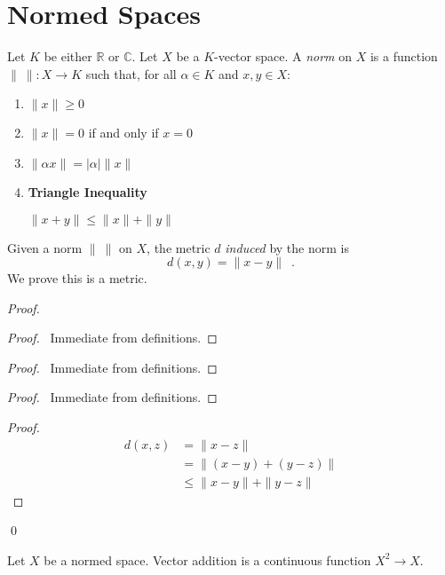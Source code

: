 \chapter{Normed Spaces}

\begin{df}[Norm]
  Let $K$ be either $\mathbb{R}$ or $\mathbb{C}$. Let $X$ be a $K$-vector space. A \emph{norm} on $X$ is a function $\|\ \| : X \rightarrow K$ such that, for all $\alpha \in K$ and $x, y \in X$:
  \begin{enumerate}
    \item
    $\| x \| \geq 0$
    \item
    $\| x \| = 0$ if and only if $x = 0$
    \item
    $\| \alpha x \| = | \alpha | \| x \|$
    \item
    \textbf{Triangle Inequality}

    $\| x + y \| \leq \| x \| + \| y \|$
  \end{enumerate}
\end{df}

\begin{df}
  Given a norm $\|\ \|$ on $X$, the metric $d$ \emph{induced} by the norm is
  \[ d(x,y) = \| x - y \| \enspace . \]
  We prove this is a metric.
\end{df}

\begin{proof}
  \pf
  \begin{proof}
    \pf\ Immediate from definitions.
  \end{proof}
  \begin{proof}
    \pf\ Immediate from definitions.
  \end{proof}
  \begin{proof}
    \pf\ Immediate from definitions.
  \end{proof}
  \begin{proof}
    \pf
    \begin{align*}
      d(x,z) & = \|x - z\| \\
      & = \|(x - y) + (y - z)\| \\
      & \leq \|x - y\| + \|y - z\|
    \end{align*}
  \end{proof}
  \qed
\end{proof}

\begin{prop}
  Let $X$ be a normed space. Vector addition is a continuous function $X^2 \rightarrow X$.
\end{prop}

